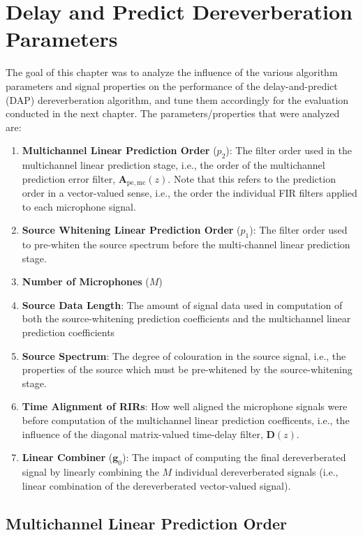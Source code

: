 \chapter{Delay and Predict Dereverberation Parameters}

The goal of this chapter was to analyze the influence of the various algorithm parameters and signal properties on the performance of the delay-and-predict (DAP) dereverberation algorithm, and tune them accordingly for the evaluation conducted in the next chapter. The parameters/properties that were analyzed are:

\begin{enumerate}
	\item \textbf{Multichannel Linear Prediction Order} ($p_2$): The filter order used in the multichannel linear prediction stage, i.e., the order of the multichannel prediction error filter, $\boldsymbol{A}_{\mathrm{pe,mc}}(z)$. Note that this refers to the prediction order in a vector-valued sense, i.e., the order the individual FIR filters applied to each microphone signal.
	\item \textbf{Source Whitening Linear Prediction Order} ($p_1$): The filter order used to pre-whiten the source spectrum before the multi-channel linear prediction stage.
	\item \textbf{Number of Microphones} ($M$)
	\item \textbf{Source Data Length}: The amount of signal data used in computation of both the source-whitening prediction coefficients and the multichannel linear prediction coefficients
	\item \textbf{Source Spectrum}: The degree of colouration in the source signal, i.e., the properties of the source which must be pre-whitened by the source-whitening stage.
	\item \textbf{Time Alignment of RIRs}: How well aligned the microphone signals were before computation of the multichannel linear prediction coefficents, i.e., the influence of the diagonal matrix-valued time-delay filter, $\boldsymbol{D}(z)$.
	\item \textbf{Linear Combiner} ($\boldsymbol{g}_0$): The impact of computing the final dereverberated signal by linearly combining the $M$ individual dereverberated signals (i.e., linear combination of the dereverberated vector-valued signal).
\end{enumerate}

\section{Multichannel Linear Prediction Order} \label{section:params_p2} 

